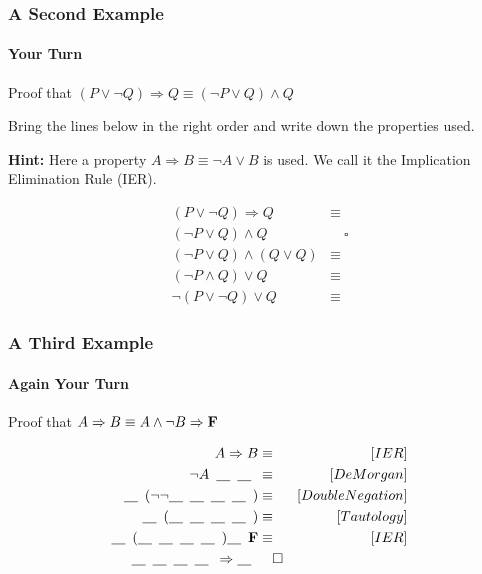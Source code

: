 \documentclass{beamer}
\theoremstyle{remark}
\begin{document}
\begin{frame}
	\frametitle{A Second Example}
	\framesubtitle{Your Turn}
	Proof that $(P \lor \lnot Q) \Rightarrow Q \equiv (\lnot P \lor Q) \land Q$

	Bring the lines below in the right order and write down the properties used.

	{\bf Hint:} Here a property $A \Rightarrow B \equiv \lnot A \lor B$ is used. We call it the Implication Elimination Rule (IER).

	\begin{align}
		(P \lor \lnot Q) \Rightarrow Q & \equiv \\
		(\lnot P \lor Q) \land Q & \hspace{1em}\square \\
		(\lnot P \lor Q) \land (Q \lor Q) & \equiv \\
		(\lnot P \land Q) \lor Q & \equiv \\
		\lnot(P \lor \lnot Q) \lor Q & \equiv
	\end{align}
\end{frame}

\begin{frame}
	\frametitle{A Third Example}
	\framesubtitle{Again Your Turn}
	Proof that $A \Rightarrow B \equiv A \land \lnot B \Rightarrow \text{{\bf F}}$

	\newcommand{\ph}{\underline{\hspace{1em}}\hspace{.5em}}

	\begin{align}
		A \Rightarrow B & \equiv & [IER] \\
		\lnot A \hspace{.5em} \ph \ph & \equiv & [DeMorgan] \\
		\ph(\lnot\lnot\ph\ph\ph\ph) & \equiv & [Double Negation] \\
		\ph(\ph \ph \ph \ph) & \equiv & [Tautology]\\
		\ph(\ph \ph \ph \ph) \ph \text{{\bf F}} & \equiv & [IER] \\
		\ph \ph \ph \ph \Rightarrow \ph & \hspace{1em}\square
	\end{align}

\end{frame}
\end{document}
